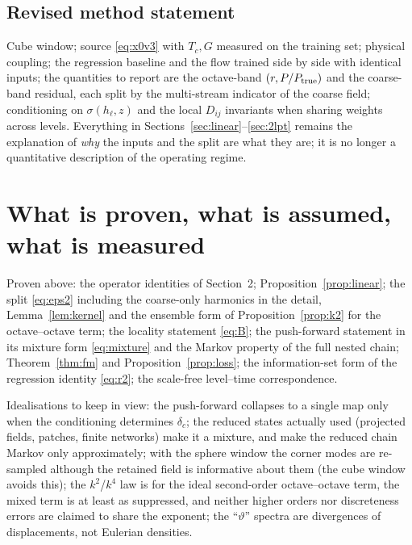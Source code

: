 \documentclass[11pt]{article}
\theoremstyle{definition}
\begin{document}
\subsection{Revised method statement}

Cube window; source \eqref{eq:x0v3} with $T_c,G$ measured on the training set; physical coupling; the regression baseline and the flow trained side by side with identical inputs; the quantities to report are the octave-band $(r,P/P_{\rm true})$ and the coarse-band residual, each split by the multi-stream indicator of the coarse field; conditioning on $\sigma(h_\ell,z)$ and the local $D_{ij}$ invariants when sharing weights across levels. Everything in Sections~\ref{sec:linear}--\ref{sec:2lpt} remains the explanation of \emph{why} the inputs and the split are what they are; it is no longer a quantitative description of the operating regime.

\section{What is proven, what is assumed, what is measured}

Proven above: the operator identities of Section~2; Proposition~\ref{prop:linear}; the split \eqref{eq:eps2} including the coarse-only harmonics in the detail, Lemma~\ref{lem:kernel} and the ensemble form of Proposition~\ref{prop:k2} for the octave--octave term; the locality statement \eqref{eq:B}; the push-forward statement in its mixture form \eqref{eq:mixture} and the Markov property of the full nested chain; Theorem~\ref{thm:fm} and Proposition~\ref{prop:loss}; the information-set form of the regression identity \eqref{eq:r2}; the scale-free level--time correspondence.

Idealisations to keep in view: the push-forward collapses to a single map only when the conditioning determines $\delta_c$; the reduced states actually used (projected fields, patches, finite networks) make it a mixture, and make the reduced chain Markov only approximately; with the sphere window the corner modes are re-sampled although the retained field is informative about them (the cube window avoids this); the $k^2$/$k^4$ law is for the ideal second-order octave--octave term, the mixed term is at least as suppressed, and neither higher orders nor discreteness errors are claimed to share the exponent; the ``$\vartheta$'' spectra are divergences of displacements, not Eulerian densities.
\end{document}
